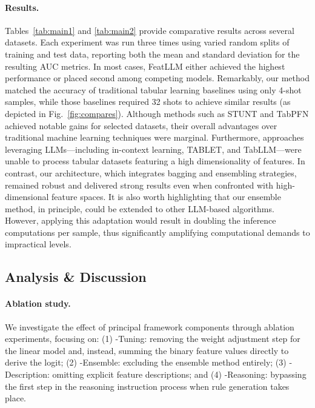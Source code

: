 \vspace*{-0.12in}
\paragraph{Results.}
Tables~\ref{tab:main1} and \ref{tab:main2} provide comparative results across several datasets. Each experiment was run three times using varied random splits of training and test data, reporting both the mean and standard deviation for the resulting AUC metrics. In most cases, \textsf{FeatLLM} either achieved the highest performance or placed second among competing models. Remarkably, our method matched the accuracy of traditional tabular learning baselines using only 4-shot samples, while those baselines required 32 shots to achieve similar results (as depicted in Fig.~\ref{fig:compares}). Although methods such as STUNT and TabPFN achieved notable gains for selected datasets, their overall advantages over traditional machine learning techniques were marginal. Furthermore, approaches leveraging LLMs—including in-context learning, TABLET, and TabLLM—were unable to process tabular datasets featuring a high dimensionality of features. In contrast, our architecture, which integrates bagging and ensembling strategies, remained robust and delivered strong results even when confronted with high-dimensional feature spaces. It is also worth highlighting that our ensemble method, in principle, could be extended to other LLM-based algorithms. However, applying this adaptation would result in doubling the inference computations per sample, thus significantly amplifying computational demands to impractical levels.

\subsection{Analysis \& Discussion}
\label{sec:analysis}
\paragraph{Ablation study.} We investigate the effect of principal framework components through ablation experiments, focusing on: (1) \textsf{-Tuning}: removing the weight adjustment step for the linear model and, instead, summing the binary feature values directly to derive the logit; (2) \textsf{-Ensemble}: excluding the ensemble method entirely; (3) \textsf{-Description}: omitting explicit feature descriptions; and (4) \textsf{-Reasoning}: bypassing the first step in the reasoning instruction process when rule generation takes place.

